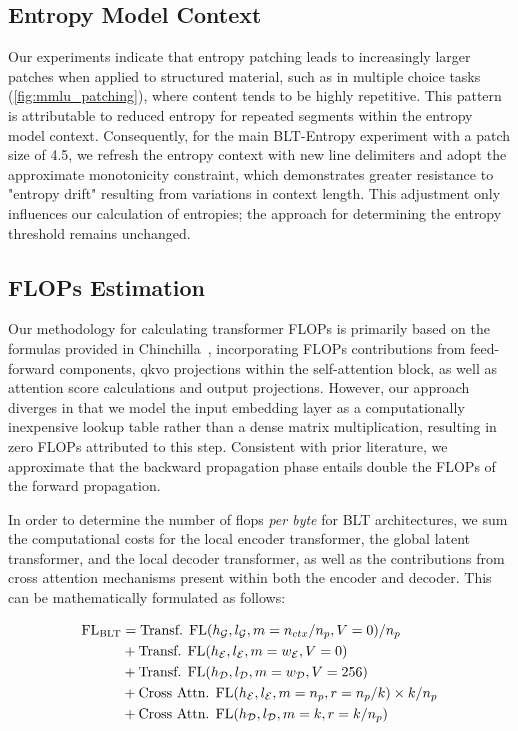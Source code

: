 \subsection{Entropy Model Context}
\label{section:entropy-context}
Our experiments indicate that entropy patching leads to increasingly larger patches when applied to structured material, such as in multiple choice tasks (\autoref{fig:mmlu_patching}), where content tends to be highly repetitive. This pattern is attributable to reduced entropy for repeated segments within the entropy model context. Consequently, for the main {\textsc BLT}-Entropy experiment with a patch size of 4.5, we refresh the entropy context with new line delimiters and adopt the approximate monotonicity constraint, which demonstrates greater resistance to "entropy drift" resulting from variations in context length. This adjustment only influences our calculation of entropies; the approach for determining the entropy threshold remains unchanged.

\subsection{FLOPs Estimation} 
\label{section:flops}

Our methodology for calculating transformer FLOPs is primarily based on the formulas provided in Chinchilla~\citep{hoffmann2022training}, incorporating FLOPs contributions from feed-forward components, qkvo projections within the self-attention block, as well as attention score calculations and output projections. However, our approach diverges in that we model the input embedding layer as a computationally inexpensive lookup table rather than a dense matrix multiplication, resulting in zero FLOPs attributed to this step. Consistent with prior literature, we approximate that the backward propagation phase entails double the FLOPs of the forward propagation.

In order to determine the number of flops \textit{per byte} for {\textsc BLT} architectures, we sum the computational costs for the local encoder transformer, the global latent transformer, and the local decoder transformer, as well as the contributions from cross attention mechanisms present within both the encoder and decoder. This can be mathematically formulated as follows:

\begin{align}
    \text{FL}_{\text{{\textsc BLT}}} &= \text{Transf. FL}(h_{\mathcal{G}}, l_{\mathcal{G}}, m=n_{ctx}/n_p,V=0) / n_p\\
   &+\text{Transf. FL}(h_{\mathcal{E}}, l_{\mathcal{E}}, m=w_{\mathcal{E}}, V=0) \\
   &+ \text{Transf. FL}(h_{\mathcal{D}}, l_{\mathcal{D}}, m=w_{\mathcal{D}}, V=256) \\ 
    &+ \text{Cross Attn. FL}(h_{\mathcal{E}}, l_{\mathcal{E}}, m=n_p, r=n_p/k) \times k/n_p \\ 
   &+ \text{Cross Attn. FL}(h_{\mathcal{D}}, l_{\mathcal{D}}, m=k, r=k/n_p) 
\end{align}

